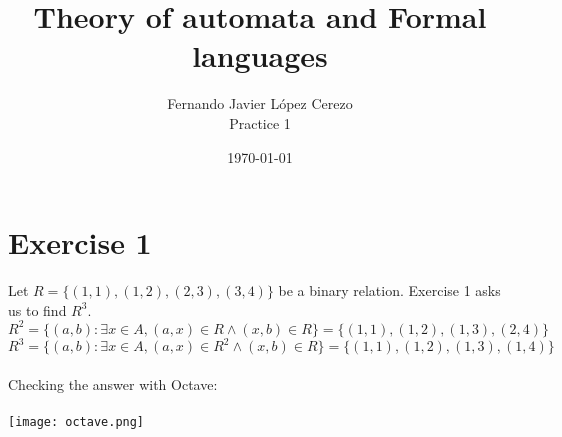 \documentclass{article}
\title{Theory of automata and Formal languages}
\author{Fernando Javier López Cerezo \\ Practice 1}
\date{\today}
\begin{document}
\maketitle

\section*{Exercise 1}
Let $R=\{(1,1),(1,2),(2,3),(3,4)\}$ be a binary relation. Exercise 1 asks us to find $R^3$. \\$R^2 = \{(a,b) : \exists x \in A, (a,x) \in R \land (x,b) \in R\} = \{(1,1),(1,2),(1,3),(2,4)\}$ \\ $R^3 = \{(a,b) : \exists x \in A, (a,x) \in R^2 \land (x,b) \in R\} = \{(1,1),(1,2),(1,3),(1,4)\}$ \\\\ Checking the answer with Octave: \\\\ \texttt{[image: octave.png]}
\end{document}
